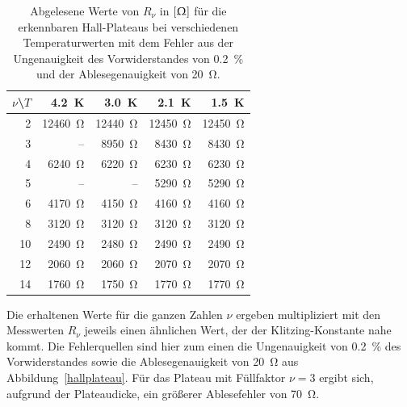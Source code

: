 \documentclass[paper=a4,fontsize=10pt,DIV=18,twocolumn,parskip=half]{scrartcl}
\numberwithin{equation}{section}    %
\newcommand{\kor}[1]{{\color{darkgreen}#1}}
\begin{document}
\begin{table}[htp]
	\begin{center}
\kor{\begin{tabular}{r|rrrr}
		$\nu$\textbackslash$T$ & \SI{4.2}{\kelvin} & \SI{3.0}{\kelvin} & \SI{2.1}{\kelvin} & \SI{1.5}{\kelvin} \\
		\hline
		2  & \SI{12460}{\ohm} & \SI{12440}{\ohm} & \SI{12450}{\ohm} & \SI{12450}{\ohm}\\
		3  &      \--- &  \SI{8950}{\ohm} &  \SI{8430}{\ohm} &  \SI{8430}{\ohm}\\
		4  &  \SI{6240}{\ohm} &  \SI{6220}{\ohm} &  \SI{6230}{\ohm} &  \SI{6230}{\ohm}\\
		5  &      \--- &      \--- &  \SI{5290}{\ohm} &  \SI{5290}{\ohm}\\
		6  &  \SI{4170}{\ohm} &  \SI{4150}{\ohm} &  \SI{4160}{\ohm} &  \SI{4160}{\ohm}\\
		8  &  \SI{3120}{\ohm} &  \SI{3120}{\ohm} &  \SI{3120}{\ohm} &  \SI{3120}{\ohm}\\
		10 &  \SI{2490}{\ohm} &  \SI{2480}{\ohm} &  \SI{2490}{\ohm} &  \SI{2490}{\ohm}\\
		12 &  \SI{2060}{\ohm} &  \SI{2060}{\ohm} &  \SI{2070}{\ohm} &  \SI{2070}{\ohm}\\
		14 &  \SI{1760}{\ohm} &  \SI{1750}{\ohm} &  \SI{1770}{\ohm} &  \SI{1770}{\ohm}\\
		\hline
	\end{tabular}
	\caption{Abgelesene Werte von $R_\nu$ in $\left[\Upomega\right]$ für die erkennbaren Hall-Plateaus bei verschiedenen Temperaturwerten mit dem Fehler aus der Ungenauigkeit des Vorwiderstandes von \SI{0.2}{\percent} und der Ablesegenauigkeit von \SI{20}{\ohm}.}
	\label{klitzing}
	}
	\end{center}
\end{table}

Die erhaltenen Werte für die ganzen Zahlen $\nu$ ergeben multipliziert mit den Messwerten $R_{\nu}$ jeweils einen ähnlichen Wert,
der der Klitzing-Konstante nahe kommt. 
\kor{
Die Fehlerquellen sind hier zum einen die Ungenauigkeit von \kor{\SI{0.2}{\percent}} des Vorwiderstandes sowie die Ablesegenauigkeit von \SI{20}{\ohm} aus Abbildung~\ref{hallplateau}. Für das Plateau mit Füllfaktor $\nu=3$ ergibt sich, aufgrund der Plateaudicke, ein größerer Ablesefehler von \SI{70}{\ohm}.
} %
\end{document}
